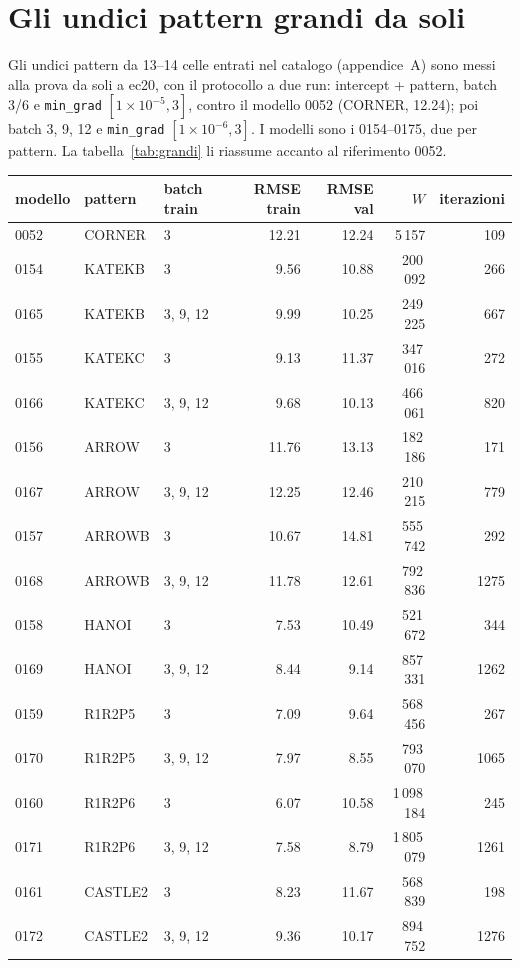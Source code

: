 \section{Gli undici pattern grandi da soli}

Gli undici pattern da 13--14 celle entrati nel catalogo
(appendice~A) sono messi alla prova da soli a ec20, con il
protocollo a due run: intercept + pattern, batch 3/6 e
\texttt{min\_grad} $[1\times10^{-5}, 3]$, contro il modello 0052
(CORNER, 12.24); poi batch 3, 9, 12 e \texttt{min\_grad}
$[1\times10^{-6}, 3]$. I modelli sono i 0154--0175, due per
pattern. La tabella~\ref{tab:grandi} li riassume accanto al
riferimento 0052.

\begin{table}[ht]
\centering
\small
\begin{tabular}{lllrrrr}
\toprule
modello & pattern & batch train & RMSE train & RMSE val & $W$ & iterazioni \\
\midrule
0052 & CORNER & 3 & 12.21 & 12.24 & 5\,157 & 109 \\
0154 & KATEKB & 3 & 9.56 & 10.88 & 200\,092 & 266 \\
0165 & KATEKB & 3, 9, 12 & 9.99 & 10.25 & 249\,225 & 667 \\
0155 & KATEKC & 3 & 9.13 & 11.37 & 347\,016 & 272 \\
0166 & KATEKC & 3, 9, 12 & 9.68 & 10.13 & 466\,061 & 820 \\
0156 & ARROW & 3 & 11.76 & 13.13 & 182\,186 & 171 \\
0167 & ARROW & 3, 9, 12 & 12.25 & 12.46 & 210\,215 & 779 \\
0157 & ARROWB & 3 & 10.67 & 14.81 & 555\,742 & 292 \\
0168 & ARROWB & 3, 9, 12 & 11.78 & 12.61 & 792\,836 & 1275 \\
0158 & HANOI & 3 & 7.53 & 10.49 & 521\,672 & 344 \\
0169 & HANOI & 3, 9, 12 & 8.44 & 9.14 & 857\,331 & 1262 \\
0159 & R1R2P5 & 3 & 7.09 & 9.64 & 568\,456 & 267 \\
0170 & R1R2P5 & 3, 9, 12 & 7.97 & 8.55 & 793\,070 & 1065 \\
0160 & R1R2P6 & 3 & 6.07 & 10.58 & 1\,098\,184 & 245 \\
0171 & R1R2P6 & 3, 9, 12 & 7.58 & 8.79 & 1\,805\,079 & 1261 \\
0161 & CASTLE2 & 3 & 8.23 & 11.67 & 568\,839 & 198 \\
0172 & CASTLE2 & 3, 9, 12 & 9.36 & 10.17 & 894\,752 & 1276 \\

\end{tabular}
\end{table}
